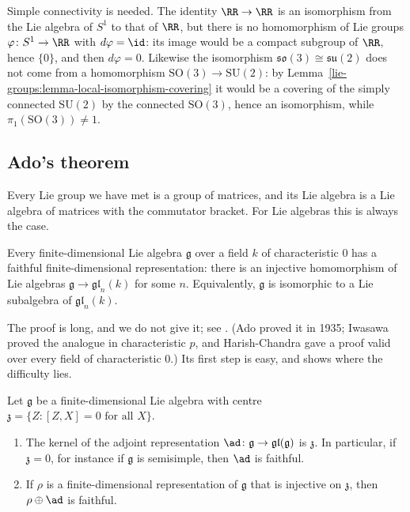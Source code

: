 \begin{counterexample}\label{lie-groups:counterexample-integrate}
Simple connectivity is needed. The identity $\RR \to \RR$ is an isomorphism from the Lie algebra of $S^1$ to that of $\RR$, but there is no homomorphism of Lie groups
$\varphi \colon S^1 \to \RR$ with $d\varphi = \id$: its image would be a compact subgroup of $\RR$, hence $\{0\}$, and then $d\varphi = 0$. Likewise the isomorphism
$\mathfrak{so}(3) \cong \mathfrak{su}(2)$ does not come from a homomorphism $\mathrm{SO}(3) \to \mathrm{SU}(2)$: by Lemma~\ref{lie-groups:lemma-local-isomorphism-covering}
it would be a covering of the simply connected $\mathrm{SU}(2)$ by the connected $\mathrm{SO}(3)$, hence an isomorphism, while $\pi_1(\mathrm{SO}(3)) \neq 1$.
\end{counterexample}

\subsection{Ado's theorem}\label{lie-groups:subsection-ado}

Every Lie group we have met is a group of matrices, and its Lie algebra is a Lie algebra of matrices with the commutator bracket. For Lie algebras this is always the case.

\begin{theorem}[Ado]\label{lie-groups:theorem-ado}
Every finite-dimensional Lie algebra $\mathfrak{g}$ over a field $k$ of characteristic $0$ has a faithful finite-dimensional representation: there is an injective
homomorphism of Lie algebras $\mathfrak{g} \to \mathfrak{gl}_n(k)$ for some $n$. Equivalently, $\mathfrak{g}$ is isomorphic to a Lie subalgebra of $\mathfrak{gl}_n(k)$.
\end{theorem}

The proof is long, and we do not give it; see \cite[Appendix B]{knapp-lie}. (Ado proved it in 1935; Iwasawa proved the analogue in characteristic $p$, and Harish-Chandra
gave a proof valid over every field of characteristic $0$.) Its first step is easy, and shows where the difficulty lies.

\begin{proposition}\label{lie-groups:proposition-ado-centre}
Let $\mathfrak{g}$ be a finite-dimensional Lie algebra with centre $\mathfrak{z} = \{Z : [Z, X] = 0 \text{ for all } X\}$.
\begin{enumerate}
\item The kernel of the adjoint representation $\ad \colon \mathfrak{g} \to \mathfrak{gl}(\mathfrak{g})$ is $\mathfrak{z}$. In particular, if $\mathfrak{z} = 0$, for instance if
$\mathfrak{g}$ is semisimple, then $\ad$ is faithful.
\item If $\rho$ is a finite-dimensional representation of $\mathfrak{g}$ that is injective on $\mathfrak{z}$, then $\rho \oplus \ad$ is faithful.
\end{enumerate}
\end{proposition}


